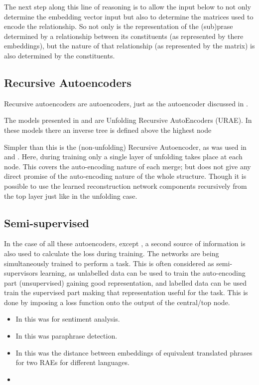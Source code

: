 \documentclass[12pt,parskip]{komatufte}
\begin{document}
The next step along this line of reasoning is to allow the input below to not only determine the embedding vector input but also to determine the matrices used to encode the relationship.
So not only is the representation of the (sub)prase determined by a relationship between  its constituents (as represented by there embeddings),
but the nature of that relationship (as represented by the matrix) is also determined by the constituents.




\subsection{Recursive Autoencoders}
Recursive autoencoders are autoencoders, just as the autoencoder discussed in .


The models presented in \textcite{SocherEtAl2011:PoolRAE} and \textcite{iyyer2014generating}
are Unfolding Recursive AutoEncoders (URAE).
In these models there an inverse tree is defined above the highest node


Simpler than this is the (non-unfolding) Recursive Autoencoder,
as was used in \textcite{SocherEtAl2011:RAE} and \textcite{zhang2014BRAE}.
Here, during training only a single layer of unfolding takes place at each node.
This covers the auto-encoding nature of each merge;
but does not give any direct promise of the auto-encoding nature of the whole structure.
Though it is possible to use the learned reconstruction network components recursively from the top layer just like in the unfolding case.

\subsection{Semi-supervised}
In the case of all these autoencoders, except \textcite{iyyer2014generating}, a second source of information is also used to calculate the loss during training.
The networks are being simultaneously trained to perform a task.
This is often considered as semi-supervisors learning, as unlabelled data can be used to train the auto-encoding part (unsupervised) gaining good representation, and labelled data can be used train the supervised part making that representation useful for the task.
This is done by imposing a loss function onto the output of the central/top node.
\begin{itemize}
 \item In \textcite{SocherEtAl2011:RAE} this was for sentiment analysis.
 \item In \textcite{SocherEtAl2011:PoolRAE} this was paraphrase detection.
 \item In \textcite{zhang2014BRAE} this was the distance between embeddings of equivalent translated phrases for two RAEs for different languages.
 \item 
\end{itemize}
\end{document}

